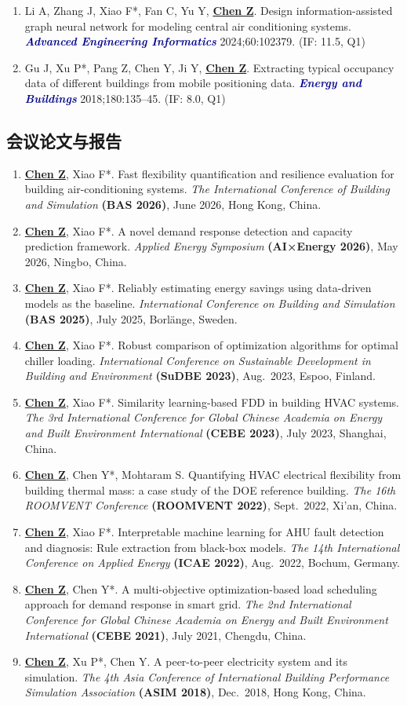 \documentclass[11pt,a4paper]{article}
\newcounter{cvbookmark}
\newcommand{\cvoutline}[2]{%
  \stepcounter{cvbookmark}%
  \pdfbookmark[#1]{#2}{cvbookmark.\thecvbookmark}%
}
\newcommand{\cvsubsection}[2]{%
  \cvoutline{2}{#1}%
  \subsection*{#2}%
}
\newcommand{\me}[1]{\underline{\textbf{#1}}}
\newcommand{\journal}[1]{\textcolor{darkblue}{\textbf{\textit{#1}}}}
\begin{document}
\begin{enumerate}
\item Li A, Zhang J, Xiao F*, Fan C, Yu Y, \me{Chen Z}. Design information-assisted graph neural network for modeling central air conditioning systems. \journal{Advanced Engineering Informatics} 2024;60:102379. (IF: 11.5, Q1)
\item Gu J, Xu P*, Pang Z, Chen Y, Ji Y, \me{Chen Z}. Extracting typical occupancy data of different buildings from mobile positioning data. \journal{Energy and Buildings} 2018;180:135--45. (IF: 8.0, Q1)
\end{enumerate}

\cvsubsection{会议论文与报告}{\color{darkblue}会议论文与报告}
\begin{enumerate}
\item \me{Chen Z}, Xiao F*. Fast flexibility quantification and resilience evaluation for building air-conditioning systems. \textit{The International Conference of Building and Simulation} \textbf{(BAS 2026)}, June 2026, Hong Kong, China.
\item \me{Chen Z}, Xiao F*. A novel demand response detection and capacity prediction framework. \textit{Applied Energy Symposium} \textbf{(AI×Energy 2026)}, May 2026, Ningbo, China.
\item \me{Chen Z}, Xiao F*. Reliably estimating energy savings using data-driven models as the baseline. \textit{International Conference on Building and Simulation} \textbf{(BAS 2025)}, July 2025, Borlänge, Sweden.
\item \me{Chen Z}, Xiao F*. Robust comparison of optimization algorithms for optimal chiller loading. \textit{International Conference on Sustainable Development in Building and Environment} \textbf{(SuDBE 2023)}, Aug.\ 2023, Espoo, Finland.
\item \me{Chen Z}, Xiao F*. Similarity learning-based FDD in building HVAC systems. \textit{The 3rd International Conference for Global Chinese Academia on Energy and Built Environment International} \textbf{(CEBE 2023)}, July 2023, Shanghai, China.
\item \me{Chen Z}, Chen Y*, Mohtaram S. Quantifying HVAC electrical flexibility from building thermal mass: a case study of the DOE reference building. \textit{The 16th ROOMVENT Conference} \textbf{(ROOMVENT 2022)}, Sept.\ 2022, Xi'an, China.
\item \me{Chen Z}, Xiao F*. Interpretable machine learning for AHU fault detection and diagnosis: Rule extraction from black-box models. \textit{The 14th International Conference on Applied Energy} \textbf{(ICAE 2022)}, Aug.\ 2022, Bochum, Germany.
\item \me{Chen Z}, Chen Y*. A multi-objective optimization-based load scheduling approach for demand response in smart grid. \textit{The 2nd International Conference for Global Chinese Academia on Energy and Built Environment International} \textbf{(CEBE 2021)}, July 2021, Chengdu, China.
\item \me{Chen Z}, Xu P*, Chen Y. A peer-to-peer electricity system and its simulation. \textit{The 4th Asia Conference of International Building Performance Simulation Association} \textbf{(ASIM 2018)}, Dec.\ 2018, Hong Kong, China.
\end{enumerate}
\end{document}
